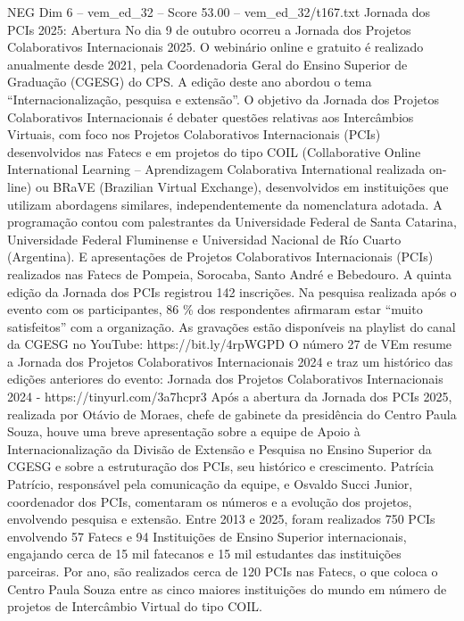 \begin{textsample}{NEG Dim 6 – vem\_ed\_32 – Score 53.00 – vem\_ed\_32/t167.txt}  \label{ex:f6_neg_157}
Jornada dos PCIs 2025: Abertura No dia 9 de outubro ocorreu a Jornada dos Projetos Colaborativos Internacionais 2025.
O webinário online e gratuito é realizado anualmente desde 2021, pela Coordenadoria Geral do Ensino Superior de Graduação (CGESG) do CPS.
A edição deste ano abordou o tema “Internacionalização, pesquisa e extensão”.
O objetivo da Jornada dos Projetos Colaborativos Internacionais é debater questões relativas aos Intercâmbios Virtuais, com foco nos Projetos Colaborativos Internacionais (PCIs) desenvolvidos nas Fatecs e em projetos do tipo COIL (Collaborative Online International Learning – Aprendizagem Colaborativa International realizada on-line) ou BRaVE (Brazilian Virtual Exchange), desenvolvidos em instituições que utilizam abordagens similares, independentemente da nomenclatura adotada.
A programação contou com palestrantes da Universidade Federal de Santa Catarina, Universidade Federal Fluminense e Universidad Nacional de Río Cuarto (Argentina).
E apresentações de Projetos Colaborativos Internacionais (PCIs) realizados nas Fatecs de Pompeia, Sorocaba, Santo André e Bebedouro.
A quinta edição da Jornada dos PCIs registrou 142 inscrições.
Na pesquisa realizada após o evento com os participantes, 86 \% dos respondentes afirmaram estar “muito satisfeitos” com a organização.
As gravações estão disponíveis na playlist do canal da CGESG no YouTube: https://bit.ly/4rpWGPD O número 27 de VEm resume a Jornada dos Projetos Colaborativos Internacionais 2024 e traz um histórico das edições anteriores do evento: Jornada dos Projetos Colaborativos Internacionais 2024 - https://tinyurl.com/3a7hcpr3 Após a abertura da Jornada dos PCIs 2025, realizada por Otávio de Moraes, chefe de gabinete da presidência do Centro Paula Souza, houve uma breve apresentação sobre a equipe de Apoio à Internacionalização da Divisão de Extensão e Pesquisa no Ensino Superior da CGESG e sobre a estruturação dos PCIs, seu histórico e crescimento.
Patrícia Patrício, responsável pela comunicação da equipe, e Osvaldo Succi Junior, coordenador dos PCIs, comentaram os números e a evolução dos projetos, envolvendo pesquisa e extensão.
Entre 2013 e 2025, foram realizados 750 PCIs envolvendo 57 Fatecs e 94 Instituições de Ensino Superior internacionais, engajando cerca de 15 mil fatecanos e 15 mil estudantes das instituições parceiras.
Por ano, são realizados cerca de 120 PCIs nas Fatecs, o que coloca o Centro Paula Souza entre as cinco maiores instituições do mundo em número de projetos de Intercâmbio Virtual do tipo COIL.

\end{textsample}
